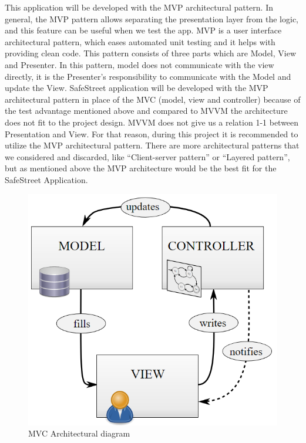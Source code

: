 
This application will be developed with the MVP architectural pattern. In general, the MVP pattern allows separating the presentation layer from the logic, and this feature can be useful when we test the app. MVP is a user interface architectural pattern, which eases automated unit testing and it helps with providing clean code. This pattern consists of three parts which are Model, View and Presenter. In this pattern, model does not communicate with the view directly, it is the Presenter’s responsibility to communicate with the Model and update the View. SafeStreet application will be developed with the MVP architectural pattern in place of the MVC (model, view and controller) because of the test advantage mentioned above and compared to MVVM the architecture does not ﬁt to the project design. MVVM does not give us a relation 1-1 between Presentation and View. For that reason, during this project it is recommended to utilize the MVP architectural pattern. There are more architectural patterns that we considered and discarded, like “Client-server pattern” or “Layered pattern”, but as mentioned above the MVP architecture would be the best ﬁt for the SafeStreet Application.

\begin{figure}
\centering
\includegraphics[width=\textwidth]{Images/MVC.png}
\caption{\label{fig:MVC} MVC Architectural diagram}
\end{figure}

